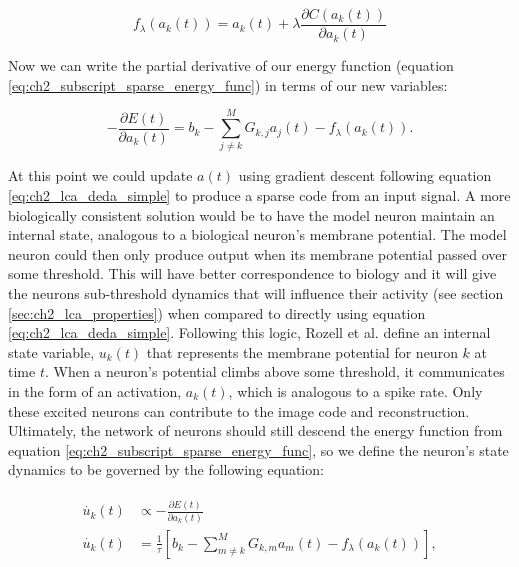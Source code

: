 \begin{equation}\label{eq:ch2_hopfield_t_func}
  f_{\lambda}(a_{k}(t)) = a_{k}(t) + \lambda \frac{\partial C(a_{k}(t))}{\partial a_{k}(t)}
\end{equation}

Now we can write the partial derivative of our energy function (equation \eqref{eq:ch2_subscript_sparse_energy_func}) in terms of our new variables:

\begin{equation}\label{eq:ch2_lca_deda_simple}
    - \frac{\partial E(t)}{\partial a_{k}(t)} =
    b_{k} -
    \sum\limits_{j \neq k}^{M} G_{k,j} a_{j}(t) -
    f_{\lambda}(a_{k}(t)).
\end{equation}

At this point we could update $a(t)$ using gradient descent following equation \eqref{eq:ch2_lca_deda_simple} to produce a sparse code from an input signal. A more biologically consistent solution would be to have the model neuron maintain an internal state, analogous to a biological neuron's membrane potential. The model neuron could then only produce output when its membrane potential passed over some threshold. This will have better correspondence to biology and it will give the neurons sub-threshold dynamics that will influence their activity (see section \ref{sec:ch2_lca_properties}) when compared to directly using equation \eqref{eq:ch2_lca_deda_simple}. Following this logic, Rozell et al. \citeyearpar{rozell2008sparse} define an internal state variable, $u_{k}(t)$ that represents the membrane potential for neuron $k$ at time $t$. When a neuron's potential climbs above some threshold, it communicates in the form of an activation, $a_{k}(t)$, which is analogous to a spike rate. Only these excited neurons can contribute to the image code and reconstruction. Ultimately, the network of neurons should still descend the energy function from equation \eqref{eq:ch2_subscript_sparse_energy_func}, so we define the neuron's state dynamics to be governed by the following equation:

\begin{align}\label{eq:ch2_u_dot}
\begin{split}
    \dot{u_{k}}(t) &\propto - \frac{\partial E(t)} {\partial a_{k}(t)} \\
    \dot{u_{k}}(t) &= \frac{1}{\tau} \left[b_{k} - \sum_{m \neq k}^{M}G_{k,m}a_{m}(t) - f_{\lambda}(a_{k}(t)) \right],
\end{split}
\end{align}


